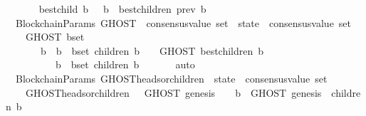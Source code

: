 \begin{isabellebody}
\ \ \isanewline
\ \ \ \ {\isachardoublequoteopen}best{\isacharunderscore}child\ b\ {\isacharequal}\ {\isacharparenleft}{\isasymlambda}{\isasymsigma}{\isachardot}\ b\ {\isasymin}\ best{\isacharunderscore}children\ {\isacharparenleft}prev\ b{\isacharcomma}\ {\isasymsigma}{\isacharparenright}{\isacharparenright}{\isachardoublequoteclose}\isanewline
\isanewline
\isanewline
\isanewline
{}\isamarkupfalse%
\ {\isacharparenleft}\ BlockchainParams{\isacharparenright}\ GHOST\ {\isacharcolon}{\isacharcolon}\ {\isachardoublequoteopen}{\isacharparenleft}consensus{\isacharunderscore}value\ set\ {\isacharasterisk}\ state{\isacharparenright}\ {\isasymRightarrow}\ consensus{\isacharunderscore}value\ set{\isachardoublequoteclose}\isanewline
\ \ \isanewline
\ \ \ \ {\isachardoublequoteopen}GHOST\ {\isacharparenleft}b{\isacharunderscore}set{\isacharcomma}\ {\isasymsigma}{\isacharparenright}\ {\isacharequal}\isanewline
\ \ \ \ \ \ {\isacharparenleft}{\isasymUnion}\ b\ {\isasymin}\ {\isacharbraceleft}b\ {\isasymin}\ b{\isacharunderscore}set{\isachardot}\ children\ {\isacharparenleft}b{\isacharcomma}\ {\isasymsigma}{\isacharparenright}\ {\isasymnoteq}\ {\isasymemptyset}{\isacharbraceright}{\isachardot}\ GHOST\ {\isacharparenleft}best{\isacharunderscore}children\ {\isacharparenleft}b{\isacharcomma}\ {\isasymsigma}{\isacharparenright}{\isacharcomma}\ {\isasymsigma}{\isacharparenright}{\isacharparenright}\isanewline
\ \ \ \ \ \ \ \ \ {\isasymunion}\ {\isacharbraceleft}b\ {\isasymin}\ b{\isacharunderscore}set{\isachardot}\ children\ {\isacharparenleft}b{\isacharcomma}\ {\isasymsigma}{\isacharparenright}\ {\isacharequal}\ {\isasymemptyset}{\isacharbraceright}{\isachardoublequoteclose}\isanewline
%
\isadelimproof
\ \ %
\endisadelimproof
%
\isatagproof
{}\isamarkupfalse%
\ auto%
\endisatagproof
{\isafoldproof}%
%
\isadelimproof
\isanewline
%
\endisadelimproof
\isanewline
{}\isamarkupfalse%
\ {\isacharparenleft}\ BlockchainParams{\isacharparenright}\ GHOST{\isacharunderscore}heads{\isacharunderscore}or{\isacharunderscore}children\ {\isacharcolon}{\isacharcolon}\ {\isachardoublequoteopen}state\ {\isasymRightarrow}\ consensus{\isacharunderscore}value\ set{\isachardoublequoteclose}\isanewline
\ \ \isanewline
\ \ \ \ {\isachardoublequoteopen}GHOST{\isacharunderscore}heads{\isacharunderscore}or{\isacharunderscore}children\ {\isasymsigma}\ {\isacharequal}\ GHOST\ {\isacharparenleft}{\isacharbraceleft}genesis{\isacharbraceright}{\isacharcomma}\ {\isasymsigma}{\isacharparenright}\ {\isasymunion}\ {\isacharparenleft}{\isasymUnion}\ b\ {\isasymin}\ GHOST\ {\isacharparenleft}{\isacharbraceleft}genesis{\isacharbraceright}{\isacharcomma}\ {\isasymsigma}{\isacharparenright}{\isachardot}\ children\ {\isacharparenleft}b{\isacharcomma}\ {\isasymsigma}{\isacharparenright}{\isacharparenright}{\isachardoublequoteclose}\isanewline

\end{isabellebody}
